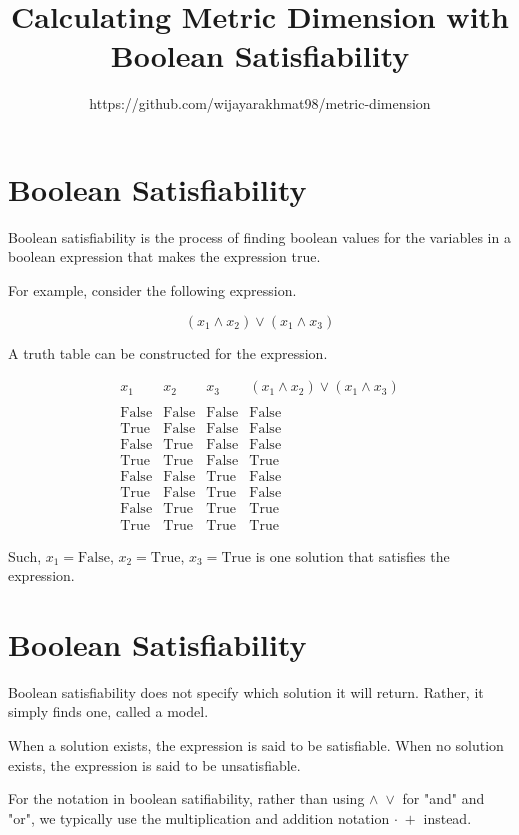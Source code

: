 \documentclass[12pt]{article}
\title{Calculating Metric Dimension with Boolean Satisfiability}
\author{https://github.com/wijayarakhmat98/metric-dimension}
\def\True{\mathrm{True}}
\def\False{\mathrm{False}}
\begin{document}
\maketitle
\thispagestyle{empty}

\newpage
\section*{Boolean Satisfiability}

Boolean satisfiability is the process of finding boolean values for the variables in a boolean expression that makes the expression true.

For example, consider the following expression.

\[ (x_1 \land x_2) \lor (x_1 \land x_3) \]

A truth table can be constructed for the expression.

\[
\begin{array}{cccc}
	   x_1 &    x_2 &    x_3 & (x_1 \land x_2) \lor (x_1 \land x_3) \\
	\\
	\False & \False & \False & \False \\
	 \True & \False & \False & \False \\
	\False &  \True & \False & \False \\
	 \True &  \True & \False &  \True \\
	\False & \False &  \True & \False \\
	 \True & \False &  \True & \False \\
	\False &  \True &  \True &  \True \\
	 \True &  \True &  \True &  \True
\end{array}
\]

Such, $x_1 = \False$, $x_2 = \True$, $x_3 = \True$ is one solution that satisfies the expression.

\newpage
\section*{Boolean Satisfiability}

Boolean satisfiability does not specify which solution it will return. Rather, it simply finds one, called a model.

When a solution exists, the expression is said to be satisfiable. When no solution exists, the expression is said to be unsatisfiable.

For the notation in boolean satifiability, rather than using $\land\;\lor$ for "and" and "or", we typically use the multiplication and addition notation $\cdot\;+$ instead.
\end{document}
